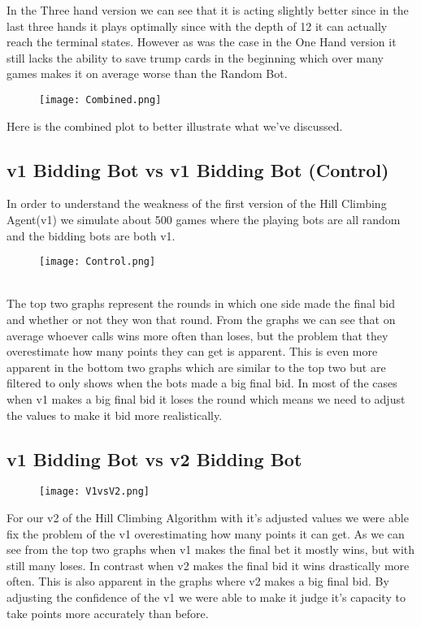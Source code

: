 In the Three hand version we can see that it is acting slightly better since in the last three hands it plays optimally since with the depth of 12 it can actually reach the terminal states.
However as was the case in the One Hand version it still lacks the ability to save trump cards in the beginning which over many games makes it on average worse than the Random Bot.
\begin{figure}[h]
    \centering
    \texttt{[image: Combined.png]}
\end{figure}
\pagebreak

Here is the combined plot to better illustrate what we've discussed.
\pagebreak
\subsection{v1 Bidding Bot vs v1 Bidding Bot (Control)}
In order to understand the weakness of the first version of the Hill Climbing Agent(v1) we simulate about 500 games where the playing bots are all random and the bidding bots are both v1.
\begin{figure}[h]
    \centering
    \texttt{[image: Control.png]}
\end{figure}\\
The top two graphs represent the rounds in which one side made the final bid and whether or not they won that round. 
From the graphs we can see that on average whoever calls wins more often than loses, but the problem that they overestimate how many points they can get is apparent. 
This is even more apparent in the bottom two graphs which are similar to the top two but are filtered to only shows when the bots made a big final bid.
In most of the cases when v1 makes a big final bid it loses the round which means we need to adjust the values to make it bid more realistically.
\pagebreak
\subsection{v1 Bidding Bot vs v2 Bidding Bot}
\begin{figure}[h]
    \centering
    \texttt{[image: V1vsV2.png]}
\end{figure}
For our v2 of the Hill Climbing Algorithm with it's adjusted values we were able fix the problem of the v1 overestimating how many points it can get.
As we can see from the top two graphs when v1 makes the final bet it mostly wins, but with still many loses. 
In contrast when v2 makes the final bid it wins drastically more often. 
This is also apparent in the graphs where v2 makes a big final bid. By adjusting the confidence of the v1 we were
able to make it judge it's capacity to take points more accurately than before. 

